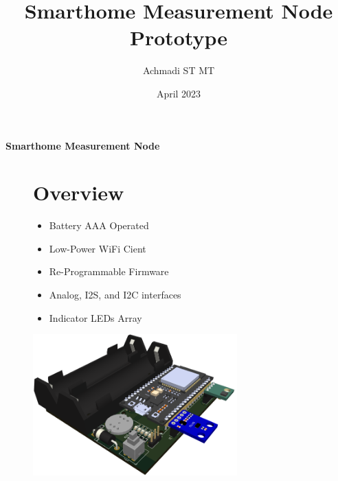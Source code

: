 \documentclass[a4paper,12pt,oneside,pdflatex,italian,final,twocolumn]{article}
\title{Smarthome Measurement Node Prototype}
\author{Achmadi ST MT}
\date{April 2023}
\begin{document}
	\pagestyle{fancy}
	
	\chead{\today}
	
	\onecolumn
	
	\begin{figure}
		
	\end{figure}\begin{minipage}{0.47\textwidth}
		\centering
		
	\end{minipage}
	\hfill
	\begin{minipage}{0.47\textwidth}
		\raggedleft
		\Huge \textbf{Smarthome Measurement Node}
	\end{minipage}

	\begin{figure}
		\begin{minipage}{0.47\textwidth}
			
			\section{Overview}
			\begin{itemize}
				\item Battery AAA Operated
				\item Low-Power WiFi Cient
				\item Re-Programmable Firmware
				\item Analog, I2S, and I2C interfaces
				\item Indicator LEDs Array
			\end{itemize}
			
			
		\end{minipage}
		\hfill
		\begin{minipage}{0.47\textwidth}
			\centering
			\includegraphics[width=0.7\textwidth,right]{images/view_ortho.png}

	\end{minipage}
	\end{figure}
\end{document}
